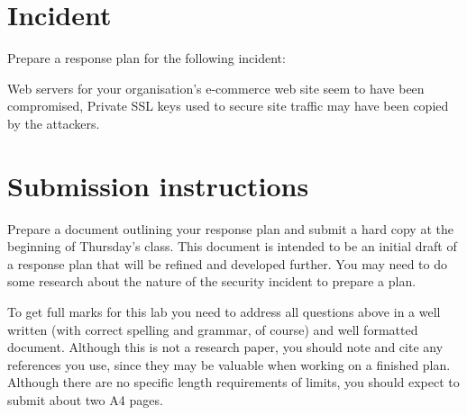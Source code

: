 \documentclass{article}
\begin{document}
\newpage 

\section{Incident}
Prepare a response plan for the following incident:

Web servers for your organisation's e-commerce web site seem to have been compromised,  Private SSL keys used to secure site traffic may have been copied by the attackers.

\section{Submission instructions}
Prepare a document outlining your response plan and submit a hard copy at the beginning of Thursday's class.  This document is intended to be an initial draft of a response plan that will be refined and developed further.  You may need to do some research about the nature of the security incident to prepare a plan.

To get full marks for this lab you need to address all questions above in a well written (with correct spelling and grammar, of course) and well formatted document. Although this is not a research paper, you should note and cite any references you use, since they may be valuable when working on a finished plan. Although there are no specific length requirements of limits, you should expect to submit about two A4 pages.
 
\end{document}
